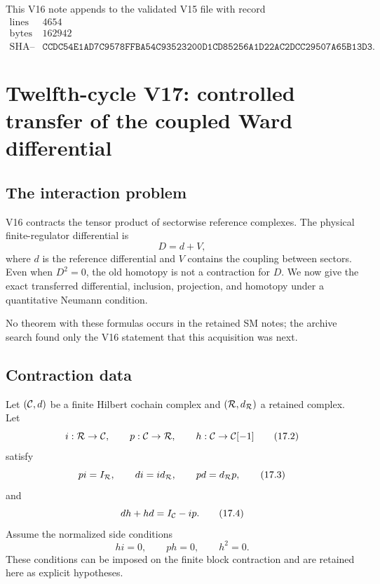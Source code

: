 \documentclass[11pt]{article}
\theoremstyle{remark}
\begin{document}
This V16 note appends to the validated V15 file with record
\[
\begin{array}{c|c}
\text{lines}&4654\\
\text{bytes}&162942\\
\text{SHA--256}&
\texttt{CCDC54E1AD7C9578FFBA54C93523200D1CD85256A1D22AC2DCC29507A65B13D3}.
\end{array}
\]


\section{Twelfth-cycle V17: controlled transfer of the coupled Ward
differential}
\label{sec:v12v17}

\subsection{The interaction problem}

V16 contracts the tensor product of sectorwise reference complexes.
The physical finite-regulator differential is
\[
                         D=d+V,                             \tag{17.1}
\]
where \(d\) is the reference differential and \(V\) contains the
coupling between sectors.  Even when \(D^2=0\), the old homotopy is
not a contraction for \(D\).  We now give the exact transferred
differential, inclusion, projection, and homotopy under a quantitative
Neumann condition.

No theorem with these formulas occurs in the retained SM notes; the
archive search found only the V16 statement that this acquisition was
next.

\subsection{Contraction data}

Let \(({\cal C},d)\) be a finite Hilbert cochain complex and
\(({\cal R},d_{\cal R})\) a retained complex.  Let
\[
 i:{\cal R}\to{\cal C},\qquad
 p:{\cal C}\to{\cal R},\qquad
 h:{\cal C}\to{\cal C}[-1]                                 \tag{17.2}
\]
satisfy
\[
 pi=I_{\cal R},\qquad
 di=id_{\cal R},\qquad
 pd=d_{\cal R}p,                                            \tag{17.3}
\]
and
\[
 dh+hd=I_{\cal C}-ip.                                      \tag{17.4}
\]
Assume the normalized side conditions
\[
 hi=0,\qquad ph=0,\qquad h^2=0.                            \tag{17.5}
\]
These conditions can be imposed on the finite block contraction and
are retained here as explicit hypotheses.
\end{document}

